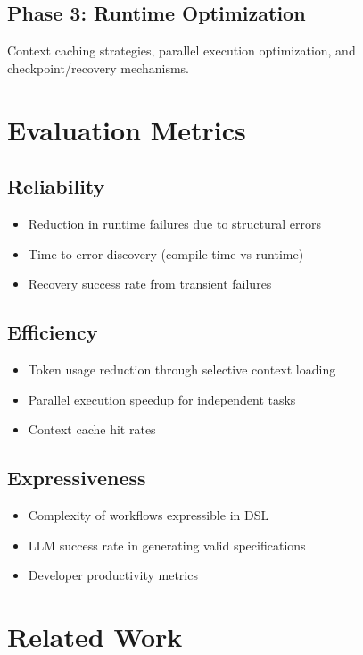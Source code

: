 \documentclass[11pt,a4paper]{article}
\begin{document}
\subsection{Phase 3: Runtime Optimization}
Context caching strategies, parallel execution optimization, and checkpoint/recovery mechanisms.

\section{Evaluation Metrics}

\subsection{Reliability}
\begin{itemize}
    \item Reduction in runtime failures due to structural errors
    \item Time to error discovery (compile-time vs runtime)
    \item Recovery success rate from transient failures
\end{itemize}

\subsection{Efficiency}
\begin{itemize}
    \item Token usage reduction through selective context loading
    \item Parallel execution speedup for independent tasks
    \item Context cache hit rates
\end{itemize}

\subsection{Expressiveness}
\begin{itemize}
    \item Complexity of workflows expressible in DSL
    \item LLM success rate in generating valid specifications
    \item Developer productivity metrics
\end{itemize}

\section{Related Work}
\end{document}
